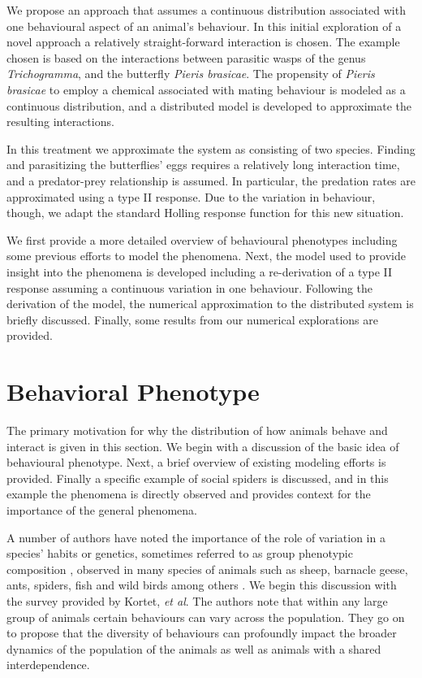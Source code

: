 \documentclass[review]{elsarticle}
\begin{document}
We propose an approach that assumes a continuous distribution
associated with one behavioural aspect of an animal's behaviour. In
this initial exploration of a novel approach a relatively
straight-forward interaction is chosen. The example chosen is based on
the interactions between parasitic wasps of the genus
\textit{Trichogramma}, and the butterfly \textit{Pieris
  brasicae}\cite{10.1093/beheco/arq007}.  The propensity of
\textit{Pieris brasicae} to employ a chemical associated with mating
behaviour is modeled as a continuous distribution, and a distributed
model is developed to approximate the resulting interactions.

In this treatment we approximate the system as consisting of two
species. Finding and parasitizing the butterflies' eggs requires a
relatively long interaction time, and a predator-prey relationship is
assumed. In particular, the predation rates are approximated using a
type II response. Due to the variation in behaviour, though, we adapt
the standard Holling response function for this new situation.

We first provide a more detailed overview of behavioural phenotypes
including some previous efforts to model the phenomena. Next, the
model used to provide insight into the phenomena is developed
including a re-derivation of a type II response assuming a continuous
variation in one behaviour. Following the derivation of the model, the
numerical approximation to the distributed system is briefly
discussed. Finally, some results from our numerical explorations are
provided.

\section{Behavioral Phenotype}
\label{section:behaviouralPhenotype}

The primary motivation for why the distribution of how animals behave
and interact is given in this section. We begin with a discussion of
the basic idea of behavioural phenotype. Next, a brief overview of
existing modeling efforts is provided. Finally a specific example of
social spiders is discussed, and in this example the phenomena is
directly observed and provides context for the importance of the
general phenomena.

A number of authors have noted the importance of the role of variation
in a species' habits or
genetics\cite{doi:10.1111/j.1461-0248.2010.01536.x,doi:10.1086/687235,mierzejewski_horn_luong_2019,SANTICCHIA20191,doi:10.1098/rspb.2014.1016}, sometimes referred to as group phenotypic composition \cite{FARINE2015609}, observed in many species of animals such as sheep, barnacle geese, ants, spiders, fish and wild birds among others \cite{sibbald2009individual,kurvers2011effect,modlmeier2012diverse,doi:10.1086/687235,doi:10.1098/rspb.2014.1016,doi:10.1037/0735-7036.107.3.250}.
We begin this discussion with the survey provided by Kortet, \textit{et
  al}\cite{doi:10.1111/j.1461-0248.2010.01536.x}. The authors note
that within any large group of animals certain behaviours can vary
across the population. They go on to propose that the diversity of
behaviours can profoundly impact the broader dynamics of the
population of the animals as well as animals with a shared
interdependence.
\end{document}
